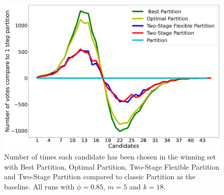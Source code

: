 \documentclass[letterpaper]{article} %
\begin{document}
\begin{figure}
 \centering
 \includegraphics[width=\columnwidth]{../images/candidates_results_18_winners_phi_0_85_last_new_new_new_new.png}
 \caption{Number of times each candidate has been chosen in the winning set with Best Partition, Optimal Partition, Two-Stage Flexible Partition and Two-Stage Partition compared to classic Partition as the baseline. All runs with $\phi = 0.85$, $m = 5$ and $k = 18$.}
 \label{fig:candidates-performances}
\end{figure}
\end{document}
